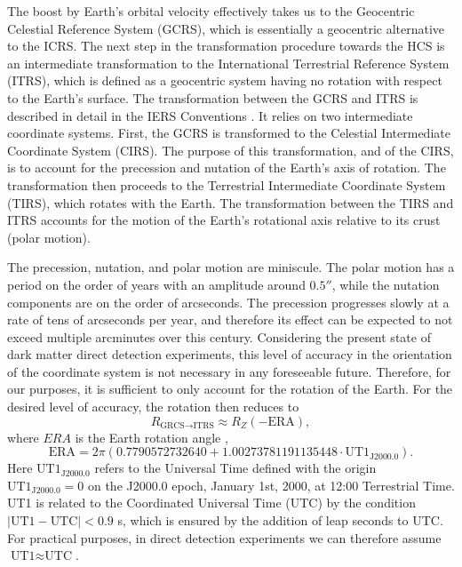The boost by Earth's orbital velocity effectively takes us to the Geocentric Celestial Reference System (GCRS), which is essentially a geocentric alternative to the ICRS. The next step in the transformation procedure towards the HCS is an intermediate transformation to the International Terrestrial Reference System (ITRS), which is defined as a geocentric system having no rotation with respect to the Earth's surface. The transformation between the GCRS and ITRS is described in detail in the IERS Conventions \parencite{LuzumPetit2010}. It relies on two intermediate coordinate systems. First, the GCRS is transformed to the Celestial Intermediate Coordinate System (CIRS). The purpose of this transformation, and of the CIRS, is to account for the precession and nutation of the Earth's axis of rotation. The transformation then proceeds to the Terrestrial Intermediate Coordinate System (TIRS), which rotates with the Earth. The transformation between the TIRS and ITRS accounts for the motion of the Earth's rotational axis relative to its crust (polar motion).

The precession, nutation, and polar motion are miniscule. The polar motion has a period on the order of years with an amplitude around $0.5''$, while the nutation components are on the order of arcseconds. The precession progresses slowly at a rate of tens of arcseconds per year, and therefore its effect can be expected to not exceed multiple arcminutes over this century. Considering the present state of dark matter direct detection experiments, this level of accuracy in the orientation of the coordinate system is not necessary in any foreseeable future. Therefore, for our purposes, it is sufficient to only account for the rotation of the Earth. For the desired level of accuracy, the rotation then reduces to
\begin{equation}
    R_{\text{GRCS}\rightarrow\text{ITRS}}\approx R_Z(-\text{ERA}),
\end{equation}
where $ERA$ is the Earth rotation angle \parencite{LuzumPetit2010},
\begin{equation}
    \text{ERA}=2\pi(0.7790572732640+1.00273781191135448\cdot\text{UT1}_\text{J2000.0}).
\end{equation}
Here $\text{UT1}_\text{J2000.0}$ refers to the Universal Time defined with the origin $\text{UT1}_\text{J2000.0}=0$ on the J2000.0 epoch, January 1st, 2000, at 12:00 Terrestrial Time. UT1 is related to the Coordinated Universal Time (UTC) by the condition $|\text{UT1}-\text{UTC}|<0.9$ s, which is ensured by the addition of leap seconds to UTC. For practical purposes, in direct detection experiments we can therefore assume $\text{UT1}\approx\text{UTC}$.

